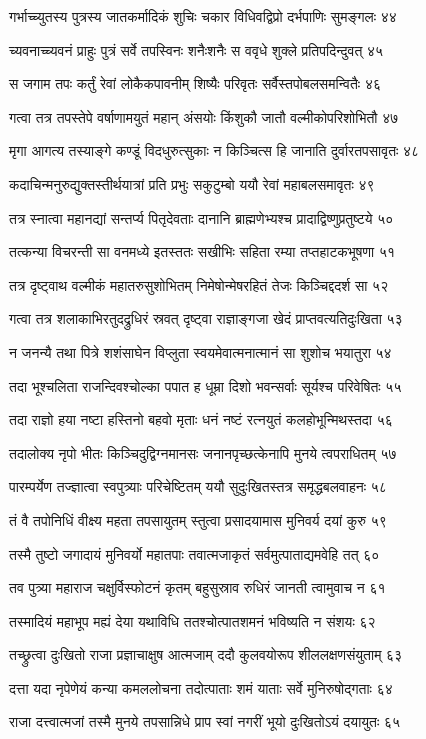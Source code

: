 गर्भाच्च्युतस्य पुत्रस्य जातकर्मादिकं शुचिः
चकार विधिवद्विप्रो दर्भपाणिः सुमङ्गलः ४४

च्यवनाच्च्यवनं प्राहुः पुत्रं सर्वे तपस्विनः
शनैःशनैः स ववृधे शुक्ले प्रतिपदिन्दुवत् ४५

स जगाम तपः कर्तुं रेवां लोकैकपावनीम्
शिष्यैः परिवृतः सर्वैस्तपोबलसमन्वितैः ४६

गत्वा तत्र तपस्तेपे वर्षाणामयुतं महान्
अंसयोः किंशुकौ जातौ वल्मीकोपरिशोभितौ ४७

मृगा आगत्य तस्याङ्गे कण्डूं विदधुरुत्सुकाः
न किञ्चित्स हि जानाति दुर्वारतपसावृतः ४८

कदाचिन्मनुरुद्युक्तस्तीर्थयात्रां प्रति प्रभुः
सकुटुम्बो ययौ रेवां महाबलसमावृतः ४९

तत्र स्नात्वा महानद्यां सन्तर्प्य पितृदेवताः
दानानि ब्राह्मणेभ्यश्च प्रादाद्विष्णुप्रतुष्टये ५०

तत्कन्या विचरन्ती सा वनमध्ये इतस्ततः
सखीभिः सहिता रम्या तप्तहाटकभूषणा ५१

तत्र दृष्ट्वाथ वल्मीकं महातरुसुशोभितम्
निमेषोन्मेषरहितं तेजः किञ्चिद्ददर्श सा ५२

गत्वा तत्र शलाकाभिरतुदद्रुधिरं स्रवत्
दृष्ट्वा राज्ञाङ्गजा खेदं प्राप्तवत्यतिदुःखिता ५३

न जनन्यै तथा पित्रे शशंसाघेन विप्लुता
स्वयमेवात्मनात्मानं सा शुशोच भयातुरा ५४

तदा भूश्चलिता राजन्दिवश्चोल्का पपात ह
धूम्रा दिशो भवन्सर्वाः सूर्यश्च परिवेषितः ५५

तदा राज्ञो हया नष्टा हस्तिनो बहवो मृताः
धनं नष्टं रत्नयुतं कलहोभून्मिथस्तदा ५६

तदालोक्य नृपो भीतः किञ्चिदुद्विग्नमानसः
जनानपृच्छत्केनापि मुनये त्वपराधितम् ५७

पारम्पर्येण तज्ज्ञात्वा स्वपुत्र्याः परिचेष्टितम्
ययौ सुदुःखितस्तत्र समृद्धबलवाहनः ५८

तं वै तपोनिधिं वीक्ष्य महता तपसायुतम्
स्तुत्वा प्रसादयामास मुनिवर्य दयां कुरु ५९

तस्मै तुष्टो जगादायं मुनिवर्यो महातपाः
तवात्मजाकृतं सर्वमुत्पाताद्यमवेहि तत् ६०

तव पुत्र्या महाराज चक्षुर्विस्फोटनं कृतम्
बहुसुस्राव रुधिरं जानती त्वामुवाच न ६१

तस्मादियं महाभूप मह्यं देया यथाविधि
ततश्चोत्पातशमनं भविष्यति न संशयः ६२

तच्छ्रुत्वा दुःखितो राजा प्रज्ञाचाक्षुष आत्मजाम्
ददौ कुलवयोरूप शीललक्षणसंयुताम् ६३

दत्ता यदा नृपेणेयं कन्या कमललोचना
तदोत्पाताः शमं याताः सर्वे मुनिरुषोद्गताः ६४

राजा दत्त्वात्मजां तस्मै मुनये तपसान्निधे
प्राप स्वां नगरीं भूयो दुःखितोऽयं दयायुतः ६५

